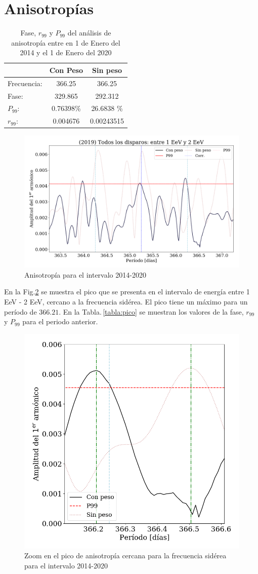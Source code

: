 \section{Anisotropías  }
\begin{table}[H]
\centering
\begin{tabular}{l|c|c}
				& Con Peso 	& Sin peso 		\\ \hline
Frecuencia:		& 366.25 	& 366.25 		\\
Fase:			& 329.865 	& 292.312		\\
$P_{99}$:		& 0.76398\%	& 26.6838 \% 	\\
$r_{99}$:		& 0.004676 	& 0.00243515	\\
\end{tabular}
\caption{Fase, $r_{99}$ y $P_{99}$ del análisis de anisotropía entre en 1 de Enero del 2014 y el 1 de Enero del 2020}
\end{table}


\begin{figure}[H]
	\centering
	\includegraphics[width=0.8\linewidth]{../report_4_12_05_2020/2019_AllTriggers_1_2_EeV_con_vs_sin_peso.png}
	\caption{Anisotropía para el intervalo 2014-2020}
	\label{fig:anis}
\end{figure}

En la Fig.\ref{fig:zoom} se muestra el pico que se presenta en  el intervalo de energía entre 1 EeV - 2 EeV, cercano a la frecuencia sidérea. El pico tiene un máximo para un período de $366.21$. En la Tabla.\,\ref{tabla:pico} se muestran los valores de la fase, $r_{99}$ y $P_{99}$ para el periodo anterior.

\begin{figure}[H]
	\centering
	\includegraphics[width=0.5\linewidth]{zoom_anis.png}
	\caption{Zoom en el pico de anisotropía cercana para la frecuencia sidérea para el intervalo 2014-2020}
	\label{fig:zoom}
\end{figure}



